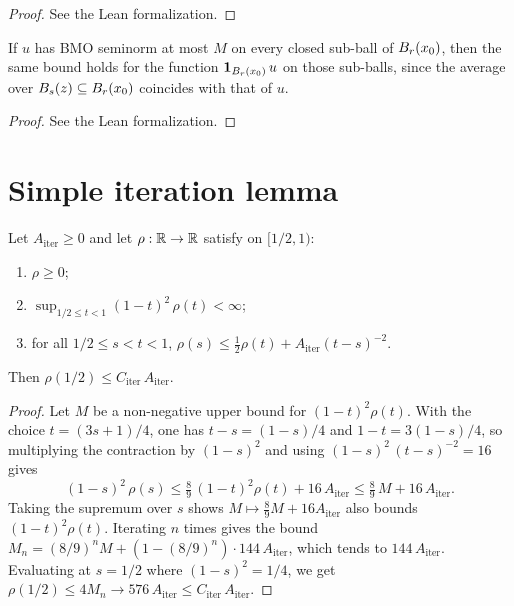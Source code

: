 \begin{proof}
\leanok
{}
See the Lean formalization.
\end{proof}

\begin{lemma}
\label{lem:indicator_bmo_bound}
\leanok
If $u$ has BMO seminorm at most $M$ on every closed sub-ball of $B_{r}(x_0)$, then
the same bound holds for the function $\mathbf{1}_{B_{r}(x_0)}\, u$ on those sub-balls,
since the average over $B_{s}(z) \subseteq B_{r}(x_0)$ coincides with that of $u$.
\end{lemma}

\begin{proof}
\leanok
See the Lean formalization.
\end{proof}

\section{Simple iteration lemma}

\begin{lemma}
\label{lem:simple_iteration_lemma}
\leanok
{}
Let $A_{\mathrm{iter}} \ge 0$ and let $\rho : \mathbb{R} \to \mathbb{R}$ satisfy on $[1/2, 1)$:
\begin{enumerate}
\item $\rho \ge 0$;
\item $\sup_{1/2 \le t < 1}(1-t)^{2}\,\rho(t) < \infty$;
\item for all $1/2 \le s < t < 1$,
$\rho(s) \le \tfrac{1}{2}\rho(t) + A_{\mathrm{iter}}(t-s)^{-2}$.
\end{enumerate}
Then $\rho(1/2) \le C_{\mathrm{iter}}\, A_{\mathrm{iter}}$.
\end{lemma}
\begin{proof}
\leanok

Let $M$ be a non-negative upper bound for $(1-t)^{2}\rho(t)$. With the choice
$t = (3s+1)/4$, one has $t-s = (1-s)/4$ and $1-t = 3(1-s)/4$, so multiplying the
contraction by $(1-s)^{2}$ and using $(1-s)^{2}\,(t-s)^{-2} = 16$ gives
\begin{equation*}
(1-s)^{2}\,\rho(s) \le \tfrac{8}{9}\,(1-t)^{2}\rho(t) + 16\, A_{\mathrm{iter}}
\le \tfrac{8}{9}\, M + 16\, A_{\mathrm{iter}}.
\end{equation*}
Taking the supremum over $s$ shows $M \mapsto \tfrac{8}{9}M + 16 A_{\mathrm{iter}}$ also
bounds $(1-t)^{2}\rho(t)$. Iterating $n$ times gives the bound
$M_n = (8/9)^{n} M + (1-(8/9)^{n})\cdot 144\, A_{\mathrm{iter}}$, which tends to
$144\,A_{\mathrm{iter}}$. Evaluating at $s = 1/2$ where $(1-s)^{2} = 1/4$, we get
$\rho(1/2) \le 4 M_n \to 576\, A_{\mathrm{iter}} \le C_{\mathrm{iter}}\,A_{\mathrm{iter}}$.
\end{proof}

